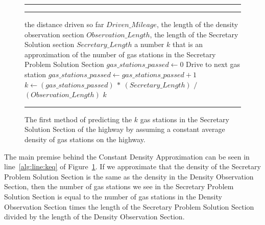 \begin{figure}[!hbt]
\vspace{0.2cm}
\hrule \medskip {} \smallskip
\hrule
\smallskip
\begin{algorithmic}[1]
 the distance driven so far $Driven\_Mileage$, the length of the density observation section $Observation\_Length$, the length of the Secretary Solution section $Secretary\_Length$
 a number $k$ that is an approximation of the number of gas stations in the Secretary Problem Solution Section
\STATE $gas\_stations\_passed \gets 0$
\STATE Drive to next gas station
\STATE $gas\_stations\_passed \gets gas\_stations\_passed + 1$
\ENDWHILE \\
\STATE $k \gets (gas\_stations\_passed)~*~(Secretary\_Length)$ $/$ $(Observation\_Length)$ \label{alg:line:keq}
\RETURN $k$
\end{algorithmic}
\hrule
\caption{The first method of predicting the $k$ gas stations in the Secretary Solution Section of the highway by assuming a constant average density of gas stations on the highway.}
\label{fig:tcp-est}
\end{figure}

The main premise behind the Constant Density Approximation can be seen in line~\ref{alg:line:keq} of Figure~\ref{fig:tcp-est}. If we approximate that the density of the Secretary Problem Solution Section is the same as the density in the Density Observation Section, then the number of gas stations we see in the Secretary Problem Solution Section is equal to the number of gas stations in the Density Observation Section times the length of the Secretary Problem Solution Section divided by the length of the Density Observation Section.
